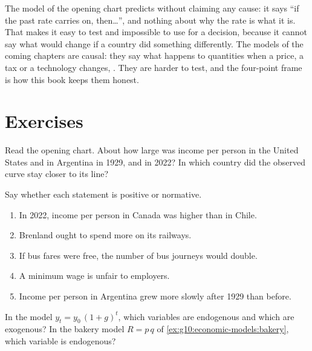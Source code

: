 \begin{remark}\label{rem:g10:economic-models:no-cause}
The model of the opening chart predicts without claiming any cause: it says ``if the past rate
carries on, then\ldots'', and nothing about why the rate is what it is. That makes it easy to test
and impossible to use for a decision, because it cannot say what would change if a country did
something differently. The models of the coming chapters are causal: they say what happens to
quantities when a price, a tax or a technology changes, . They are harder to
test, and the four-point frame is how this book keeps them honest.
\end{remark}

\section{Exercises}

\begin{exercise}[$\star$]\label{exo:g10:economic-models:1}
Read the opening chart. About how large was income per person in the United States and in Argentina
in 1929, and in 2022? In which country did the observed curve stay closer to its line?
\end{exercise}

\begin{exercise}[$\star$]\label{exo:g10:economic-models:2}
Say whether each statement is positive or normative.
\begin{enumerate}
\item In 2022, income per person in Canada was higher than in Chile.
\item Brenland ought to spend more on its railways.
\item If bus fares were free, the number of bus journeys would double.
\item A minimum wage is unfair to employers.
\item Income per person in Argentina grew more slowly after 1929 than before.
\end{enumerate}
\end{exercise}

\begin{exercise}[$\star$]\label{exo:g10:economic-models:3}
In the model $y_t = y_0\,(1+g)^t$, which variables are endogenous and which are exogenous? In the
bakery model $R = p\,q$ of \cref{ex:g10:economic-models:bakery}, which variable is endogenous?
\end{exercise}

